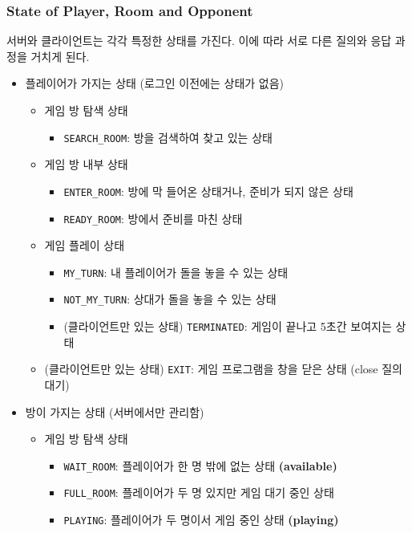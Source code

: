 \documentclass[a4paper, 10pt]{article}
\begin{document}
\subsubsection{State of Player, Room and Opponent}
서버와 클라이언트는 각각 특정한 상태를 가진다. 이에 따라 서로 다른 질의와 응답 과정을
거치게 된다.
\begin{itemize}
  \item 플레이어가 가지는 상태 (로그인 이전에는 상태가 없음)
  \begin{itemize}
    \item 게임 방 탐색 상태
    \begin{itemize}
      \item \texttt{SEARCH\_ROOM}: 방을 검색하여 찾고 있는 상태
    \end{itemize}
    \item 게임 방 내부 상태
    \begin{itemize}
      \item \texttt{ENTER\_ROOM}: 방에 막 들어온 상태거나, 준비가 되지 않은 상태
      \item \texttt{READY\_ROOM}: 방에서 준비를 마친 상태
    \end{itemize}
    \item 게임 플레이 상태
    \begin{itemize}
      \item \texttt{MY\_TURN}: 내 플레이어가 돌을 놓을 수 있는 상태
      \item \texttt{NOT\_MY\_TURN}: 상대가 돌을 놓을 수 있는 상태
      \item (클라이언트만 있는 상태) \texttt{TERMINATED}: 게임이 끝나고 5초간 보여지는 상태
    \end{itemize}
    \item (클라이언트만 있는 상태) \texttt{EXIT}: 게임 프로그램을 창을 닫은 상태 (close 질의 대기)
  \end{itemize}
  \item 방이 가지는 상태 (서버에서만 관리함)
  \begin{itemize}
    \item 게임 방 탐색 상태
    \begin{itemize}
      \item \texttt{WAIT\_ROOM}: 플레이어가 한 명 밖에 없는 상태 \textbf{\color{red}(available)}
      \item \texttt{FULL\_ROOM}: 플레이어가 두 명 있지만 게임 대기 중인 상태
      \item \texttt{PLAYING}: 플레이어가 두 명이서 게임 중인 상태 \textbf{\color{red}(playing)}

\end{itemize}
\end{itemize}
\end{itemize}
\end{document}

